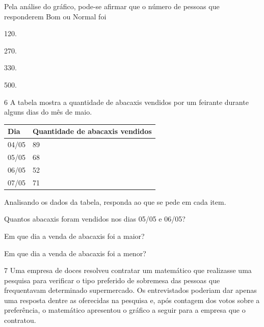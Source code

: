 Pela análise do gráfico, pode-se afirmar que o número de pessoas que
responderem Bom ou Normal foi

\begin{minipage}{.5\textwidth}
\begin{escolha}
\item
  120.
\item
  270.
\item
  330.
\item
  500.
\end{escolha}
\end{minipage}

\num{6} A tabela mostra a quantidade de abacaxis vendidos por um feirante
durante alguns dias do mês de maio.

\begin{longtable}[]{@{}ll@{}}
\toprule
Dia & Quantidade de abacaxis vendidos\tabularnewline
\midrule
\endhead
04/05 & 89\tabularnewline
05/05 & 68\tabularnewline
06/05 & 52\tabularnewline
07/05 & 71\tabularnewline
\bottomrule
\end{longtable}

Analisando os dados da tabela, responda ao que se pede em cada item.

\begin{escolha}
\item Quantos abacaxis foram vendidos nos dias 05/05 e 06/05?
  

\item Em que dia a venda de abacaxis foi a maior?
  

\item Em que dia a venda de abacaxis foi a menor?
  
\end{escolha}

\num{7} Uma empresa de doces resolveu contratar um matemático que realizasse uma
pesquisa para verificar o tipo preferido de sobremesa das pessoas que
frequentavam determinado supermercado. Os entrevistados poderiam dar
apenas uma resposta dentre as oferecidas na pesquisa e, após contagem dos
votos sobre a preferência, o matemático apresentou o gráfico a seguir
para a empresa que o contratou.

